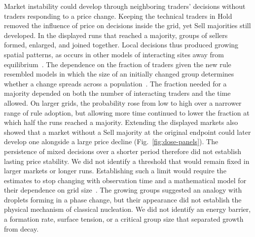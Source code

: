 Market instability could develop through neighboring traders' decisions
without traders responding to a price change. Keeping the technical traders in
Hold removed the influence of price on decisions inside the grid, yet Sell
majorities still developed. In the displayed runs that reached a majority,
groups of sellers formed, enlarged, and joined together. Local decisions
thus produced growing spatial patterns, as occurs in other models of
interacting sites away from
equilibrium~\cite{hinrichsen2000nonequilibrium,bray1994theory}. The
dependence on the fraction of traders given the new rule resembled models in
which the size of an initially changed group determines whether a change
spreads across a
population~\cite{granovetter1978threshold,watts2002simple,aizenman1988metastability,holroyd2003sharp}.
The fraction needed for a majority depended on both the number of
interacting traders and the time allowed. On larger grids, the probability
rose from low to high over a narrower range of rule adoption, but allowing
more time continued to lower the fraction at which half the runs reached a
majority. Extending the displayed markets also showed that a market without
a Sell majority at the original endpoint could later develop one alongside
a large price decline (Fig.~\ref{fig:dose-panels}). The persistence of mixed
decisions over a shorter period therefore did not establish lasting price
stability. We did not identify a threshold that would remain fixed
in larger markets or longer runs. Establishing such a limit would require
the estimates to stop changing with observation time and a mathematical
model for their dependence on grid
size~\cite{binder1981finite,landau2021guide}. The growing groups suggested an analogy with droplets forming in a
phase change, but their appearance did not establish the physical
mechanism of classical nucleation. We did not identify an energy
barrier, a formation rate, surface tension, or a critical group size
that separated growth from decay.

